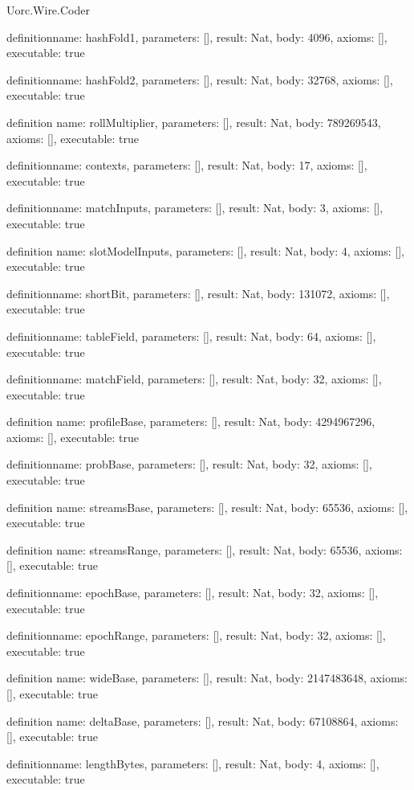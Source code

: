 \begin{lexlean}{Uorc.Wire.Coder}
\begin{semanticmodule}
definition{name: hashFold1, parameters: [], result: Nat, body: 4096, axioms: [], executable: true}

definition{name: hashFold2, parameters: [], result: Nat, body: 32768, axioms: [], executable: true}

definition{
  name: rollMultiplier,
  parameters: [],
  result: Nat,
  body: 789269543,
  axioms: [],
  executable: true
}

definition{name: contexts, parameters: [], result: Nat, body: 17, axioms: [], executable: true}

definition{name: matchInputs, parameters: [], result: Nat, body: 3, axioms: [], executable: true}

definition{
  name: slotModelInputs,
  parameters: [],
  result: Nat,
  body: 4,
  axioms: [],
  executable: true
}

definition{name: shortBit, parameters: [], result: Nat, body: 131072, axioms: [], executable: true}

definition{name: tableField, parameters: [], result: Nat, body: 64, axioms: [], executable: true}

definition{name: matchField, parameters: [], result: Nat, body: 32, axioms: [], executable: true}

definition{
  name: profileBase,
  parameters: [],
  result: Nat,
  body: 4294967296,
  axioms: [],
  executable: true
}

definition{name: probBase, parameters: [], result: Nat, body: 32, axioms: [], executable: true}

definition{
  name: streamsBase,
  parameters: [],
  result: Nat,
  body: 65536,
  axioms: [],
  executable: true
}

definition{
  name: streamsRange,
  parameters: [],
  result: Nat,
  body: 65536,
  axioms: [],
  executable: true
}

definition{name: epochBase, parameters: [], result: Nat, body: 32, axioms: [], executable: true}

definition{name: epochRange, parameters: [], result: Nat, body: 32, axioms: [], executable: true}

definition{
  name: wideBase,
  parameters: [],
  result: Nat,
  body: 2147483648,
  axioms: [],
  executable: true
}

definition{
  name: deltaBase,
  parameters: [],
  result: Nat,
  body: 67108864,
  axioms: [],
  executable: true
}

definition{name: lengthBytes, parameters: [], result: Nat, body: 4, axioms: [], executable: true}


\end{semanticmodule}
\end{lexlean}
